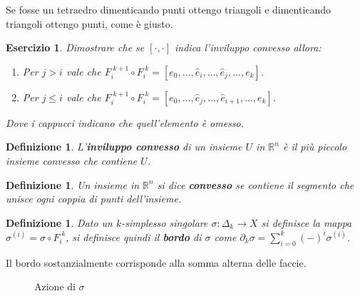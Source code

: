 \documentclass[10pt, twoside=false, x11names]{scrbook}
\newtheorem{definition}[theorem]{Definizione}
\newcounter{exercises}
\newtheorem{exercise}[exercises]{Esercizio}
\newcommand{\RN}[1][]{\mathbb{R}^#1}
\begin{document}
Se fosse un tetraedro dimenticando punti ottengo triangoli e dimenticando
triangoli ottengo punti, come è giusto.

\begin{exercise}
  Dimostrare che se $ [\cdot, \cdot] $ indica l'inviluppo convesso allora:
  \begin{enumerate}
  \item Per $ j > i $ vale che $ F_i^{\; k+1} \circ F_i^{\; k} = [e_0, \dots, \hat{e}_i, \dots, \hat{e}_j, \dots, e_k ] $.
  \item Per $ j \leq i $ vale che $ F_i^{\; k+1} \circ F_i^{\; k} = [e_0, \dots, \hat{e}_j, \dots, \hat{e}_{i+1}, \dots, e_k ] $.
  \end{enumerate}
  Dove i cappucci indicano che quell'elemento è omesso.
\end{exercise}

\begin{definition}
  L'\textbf{inviluppo convesso} di un insieme $ U $ in $ \RN{n} $ è il più piccolo
  insieme convesso che contiene $ U $.
\end{definition}
\begin{definition}
  Un insieme in $ \RN{n} $ si dice \textbf{convesso} se contiene
  il segmento che unisce ogni coppia di punti dell'insieme.
\end{definition}

\begin{definition}
  Dato un $ k $-simplesso singolare $ \sigma: \Delta_k \to X $ si definisce la mappa $ \sigma^{(i)} = \sigma \circ F_i^{\; k} $,
  si definisce quindi il \textbf{bordo} di $ \sigma $ come $ \partial_k \sigma = \sum_{i=0}^{k}(-)^i \sigma^{(i)} $.
\end{definition}
Il bordo sostanzialmente corrisponde alla somma alterna delle faccie.

\begin{figure}[htbp]
  \centering
  \caption{Azione di $ \sigma $}
  \label{fig:lez1:sigma}
\end{figure}
\end{document}
